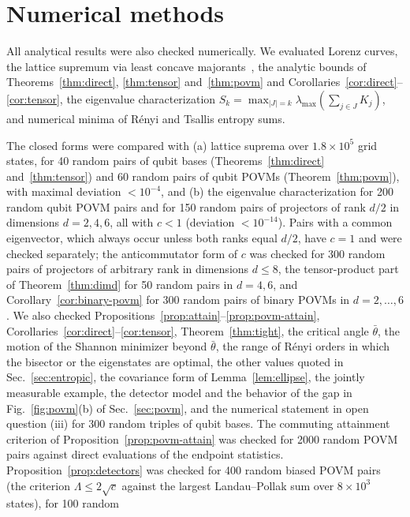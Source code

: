\documentclass[aps,pra,twocolumn,superscriptaddress,nofootinbib,floatfix]{revtex4-2}
\theoremstyle{definition}
\newcommand{\sqc}{\sqrt{c}}
\begin{document}
\section{Numerical methods}
\label{app:numerics}

All analytical results were also checked numerically. We evaluated Lorenz
curves, the lattice supremum via least concave
majorants~\cite{CicaleseVaccaro2002}, the analytic bounds of
Theorems~\ref{thm:direct}, \ref{thm:tensor} and~\ref{thm:povm} and
Corollaries~\ref{cor:direct}--\ref{cor:tensor}, the eigenvalue characterization
$S_k=\max_{|J|=k}\lambda_{\max}(\sum_{j\in J}K_j)$, and numerical minima of
R\'enyi and Tsallis entropy sums.

The closed forms were compared with (a) lattice suprema over $1.8\times10^5$
grid states, for 40 random pairs of qubit bases (Theorems~\ref{thm:direct}
and~\ref{thm:tensor}) and 60 random pairs of qubit POVMs
(Theorem~\ref{thm:povm}), with maximal deviation $<10^{-4}$, and (b) the eigenvalue
characterization for 200 random qubit POVM pairs and for 150 random pairs of
projectors of rank $d/2$ in dimensions $d=2,4,6$, all with $c<1$ (deviation
$<10^{-14}$). Pairs with a common eigenvector, which always occur unless both
ranks equal $d/2$, have $c=1$ and were checked separately; the anticommutator
form of $c$ was checked for 300 random pairs of projectors of arbitrary rank in
dimensions $d\le8$, the tensor-product part of Theorem~\ref{thm:dimd} for 50
random pairs in $d=4,6$, and Corollary~\ref{cor:binary-povm} for 300 random
pairs of binary POVMs in $d=2,\dots,6$. We also checked
Propositions~\ref{prop:attain}--\ref{prop:povm-attain},
Corollaries~\ref{cor:direct}--\ref{cor:tensor},
Theorem~\ref{thm:tight}, the critical angle $\bar\theta$, the motion of the
Shannon minimizer beyond $\bar\theta$, the range of R\'enyi orders in which the
bisector or the eigenstates are optimal, the other values quoted in
Sec.~\ref{sec:entropic}, the covariance form of Lemma~\ref{lem:ellipse}, the
jointly measurable example, the detector model and the behavior of the gap in
Fig.~\ref{fig:povm}(b) of Sec.~\ref{sec:povm}, and the numerical statement in
open question (iii) for 300 random triples of qubit bases.
The commuting attainment criterion of
Proposition~\ref{prop:povm-attain} was checked for 2000 random POVM pairs against
direct evaluations of the endpoint statistics. Proposition~\ref{prop:detectors}
was checked for 400 random biased POVM pairs (the criterion $\Lambda\le2\sqc$
against the largest Landau--Pollak sum over $8\times10^3$ states), for 100 random
\end{document}
